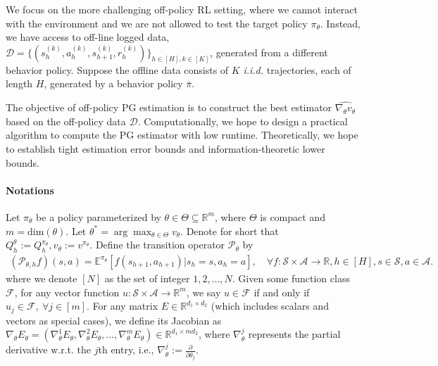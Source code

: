 \documentclass{article}
\numberwithin{equation}{section}
\begin{document}
We focus on the more challenging off-policy RL setting, where we cannot interact with the environment and we are not allowed to test the target policy $\pi_{\theta}$. Instead, we have access to off-line logged data, $\mathcal{D}=\{(s^{(k)}_h,a^{(k)}_h,s^{(k)}_{h+1},r^{(k)}_h)\}_{h\in[H],k\in[K]}$, generated from a different behavior policy.
Suppose the offline data consists of $K$ \textit{i.i.d.} trajectories, each of length $H$, generated by a behavior policy $\bar{\pi}$. %

The objective of off-policy PG estimation is to construct the best estimator $\widehat{\nabla_{\theta} v_{\theta}}$ based on the off-policy data $\mathcal{D}$. Computationally, we hope to design a practical algorithm to compute the PG estimator with low runtime. Theoretically, we hope to establish tight estimation error bounds and information-theoretic lower bounds.



\paragraph{Notations}
Let $\pi_\theta$ be a policy parameterized by $\theta\in\Theta\subseteq\mathbb{R}^m$, where $\Theta$ is compact and $m=\textrm{dim}(\theta)$. Let $\theta^*=\arg\max_{\theta\in\Theta}v_\theta$. Denote for short that $Q^\theta_h:=Q^{\pi_\theta}_h, v_\theta := v^{\pi_\theta}$. 
Define the transition operator $\mathcal{P}_\theta$ by
\begin{align*}
	\left(\mathcal{P}_{\theta, h} f\right)(s,a)=\mathbb{E}^{\pi_\theta}\left[f(s_{h+1}, a_{h+1})\vert s_h=s, a_h=a\right],\quad\forall f:\mathcal{S}\times\mathcal{A}\rightarrow\mathbb{R},h\in[H],s\in\mathcal{S},a\in\mathcal{A}.
\end{align*}
where we denote $[N]$ as the set of integer $1,2,...,N$. Given some function class $\mathcal{F}$, for any vector function $u:\mathcal{S}\times\mathcal{A}\rightarrow\mathbb{R}^{m}$, we say $u\in\mathcal{F}$ if and only if $u_j\in\mathcal{F},\ \forall j\in[m]$. For any matrix $E\in\mathbb{R}^{d_1\times d_2}$ (which includes scalars and vectors as special cases), we define its Jacobian as $\nabla_\theta E_\theta = (\nabla_\theta^1 E_\theta, \nabla_\theta^2 E_\theta, \ldots, \nabla_\theta^m E_\theta)\in\mathbb{R}^{d_1\times md_2}$, where $\nabla_\theta^j$ represents the partial derivative w.r.t. the $j$th entry, i.e., $\nabla_\theta^j := \frac{\partial}{\partial\theta_j}$. %
\end{document}
